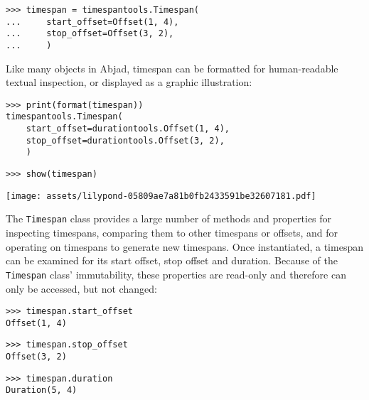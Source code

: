 \begin{abjadbookoutput}
\begin{singlespacing}
\vspace{-0.5\baselineskip}
\begin{verbatim}
>>> timespan = timespantools.Timespan(
...     start_offset=Offset(1, 4),
...     stop_offset=Offset(3, 2),
...     )
\end{verbatim}
\end{singlespacing}
\end{abjadbookoutput}

\noindent Like many objects in Abjad, timespan can be formatted for
human-readable textual inspection, or displayed as a graphic illustration:

\begin{comment}
<abjad>
print(format(timespan))
show(timespan)
</abjad>
\end{comment}

\begin{abjadbookoutput}
\begin{singlespacing}
\vspace{-0.5\baselineskip}
\begin{verbatim}
>>> print(format(timespan))
timespantools.Timespan(
    start_offset=durationtools.Offset(1, 4),
    stop_offset=durationtools.Offset(3, 2),
    )
\end{verbatim}
\begin{verbatim}
>>> show(timespan)
\end{verbatim}
\noindent\texttt{[image: assets/lilypond-05809ae7a81b0fb2433591be32607181.pdf]}
\end{singlespacing}
\end{abjadbookoutput}

\noindent The \texttt{Timespan} class provides a large number of methods and
properties for inspecting timespans, comparing them to other timespans or
offsets, and for operating on timespans to generate new timespans. Once
instantiated, a timespan can be examined for its start offset, stop offset
and duration. Because of the \texttt{Timespan} class' immutability, these
properties are read-only and therefore can only be accessed, but not changed:

\begin{comment}
<abjad>
timespan.start_offset
timespan.stop_offset
timespan.duration
</abjad>
\end{comment}

\begin{abjadbookoutput}
\begin{singlespacing}
\vspace{-0.5\baselineskip}
\begin{verbatim}
>>> timespan.start_offset
Offset(1, 4)
\end{verbatim}
\begin{verbatim}
>>> timespan.stop_offset
Offset(3, 2)
\end{verbatim}
\begin{verbatim}
>>> timespan.duration
Duration(5, 4)
\end{verbatim}
\end{singlespacing}
\end{abjadbookoutput}


